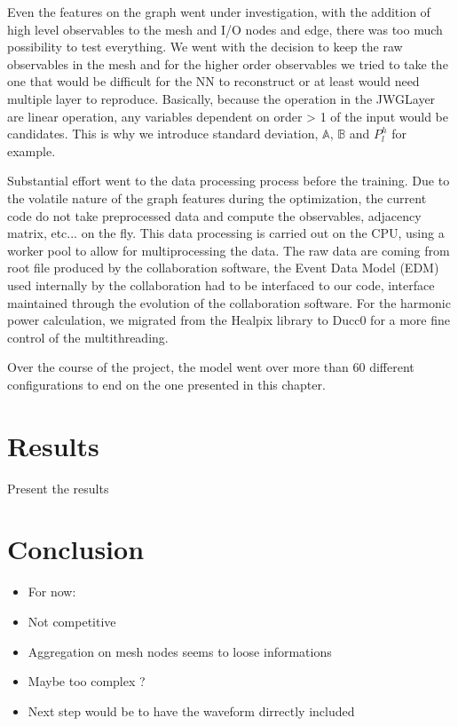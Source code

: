 \documentclass[../main.tex]{subfiles}
\begin{document}
Even the features on the graph went under investigation, with the addition of high level observables to the {\color{Dandelion} mesh} and {\color{blue} I/O} nodes and edge, there was too much possibility to test everything. We went with the decision to keep the raw observables in the {\color{Dandelion} mesh} and for the higher order observables we tried to take the one that would be difficult for the NN to reconstruct or at least would need multiple layer to reproduce. Basically, because the operation in the JWGLayer are linear operation, any variables dependent on order  > 1 of the input would be candidates. This is why we introduce standard deviation, $\mathbb{A}$, $\mathbb{B}$ and $P^h_l$ for example.

Substantial effort went to the data processing process before the training. Due to the volatile nature of the graph features during the optimization, the current code do not take preprocessed data and compute the observables, adjacency matrix, etc... on the fly. This data processing is carried out on the CPU, using a worker pool to allow for multiprocessing the data. The raw data are coming from root file produced by the collaboration software, the Event Data Model (EDM) used internally by the collaboration \cite{li_design_2017} had to be interfaced to our code, interface maintained through the evolution of the collaboration software. For the harmonic power calculation, we migrated from the Healpix library to Ducc0 \cite{reinecke_ducc0_2024} for a more fine control of the multithreading.

Over the course of the project, the model went over more than 60 different configurations to end on the one presented in this chapter.

\section{Results}
\label{sec:jgnn:results}
Present the results

\section{Conclusion}
\begin{itemize}
  \item For now:
  \item Not competitive
  \item Aggregation on mesh nodes seems to loose informations
  \item Maybe too complex ?
  \item Next step would be to have the waveform dirrectly included
\end{itemize}
\end{document}
